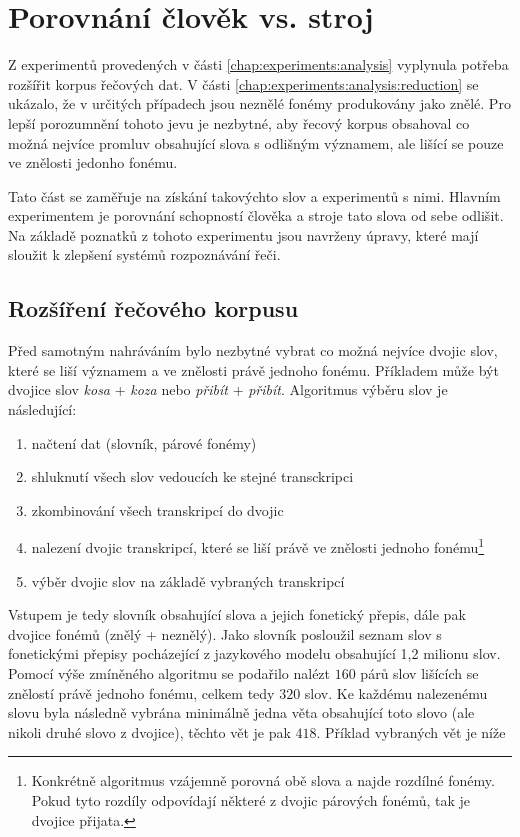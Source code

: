 \section{Porovnání člověk vs. stroj}
\label{chap:experiments:normalization}

Z experimentů provedených v části \ref{chap:experiments:analysis} vyplynula potřeba rozšířit korpus řečových dat. V části \ref{chap:experiments:analysis:reduction} se ukázalo, že v určitých případech jsou neznělé fonémy produkovány jako znělé. Pro lepší porozumnění tohoto jevu je nezbytné, aby řecový korpus obsahoval co možná nejvíce promluv obsahující slova s odlišným významem, ale lišící se pouze ve znělosti jedonho fonému.

Tato část se zaměřuje na získání takovýchto slov a experimentů s nimi. Hlavním experimentem je porovnání schopností člověka a stroje tato slova od sebe odlišit. Na základě poznatků z tohoto experimentu jsou navrženy úpravy, které mají sloužit k zlepšení systémů rozpoznávání řeči.

\subsection{Rozšíření řečového korpusu}
\label{chap:experiments:normalization:corpus}

Před samotným nahráváním bylo nezbytné vybrat co možná nejvíce dvojic slov, které se liší významem a ve znělosti právě jednoho fonému. Příkladem může být dvojice slov \textit{kosa} + \textit{koza} nebo \textit{přibít} + \textit{přibít}. Algoritmus výběru slov je následující:

\begin{enumerate}
  \item načtení dat (slovník, párové fonémy)
  \item shluknutí všech slov vedoucích ke stejné transckripci
  \item zkombinování všech transkripcí do dvojic
  \item nalezení dvojic transkripcí, které se liší právě ve znělosti jednoho fonému\footnote{Konkrétně algoritmus vzájemně porovná obě slova a najde rozdílné fonémy. Pokud tyto rozdíly odpovídají některé z dvojic párových fonémů, tak je dvojice přijata.}
  \item výběr dvojic slov na základě vybraných transkripcí
\end{enumerate}

Vstupem je tedy slovník obsahující slova a jejich fonetický přepis, dále pak dvojice fonémů (znělý + neznělý). Jako slovník posloužil seznam slov s fonetickými přepisy pocházející z jazykového modelu obsahující 1,2 milionu slov. Pomocí výše zmíněného algoritmu se podařilo nalézt $160$ párů slov lišících se znělostí právě jednoho fonému, celkem tedy $320$ slov. Ke každému nalezenému slovu byla následně vybrána minimálně jedna věta obsahující toto slovo (ale nikoli druhé slovo z dvojice), těchto vět je pak $418$. Příklad vybraných vět je níže

